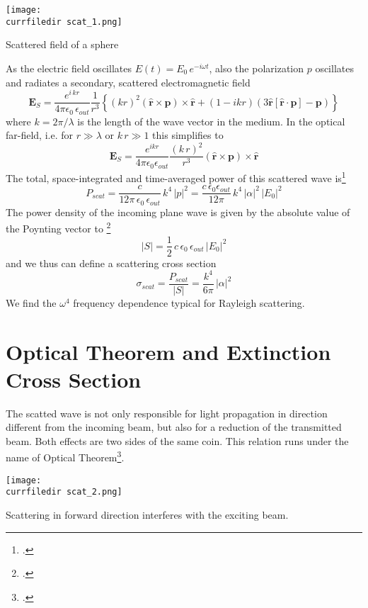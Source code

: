 \begin{marginfigure}
   \texttt{[image: \\currfiledir scat\_1.png]}
  \caption{Scattered field of  a sphere}
\end{marginfigure}


As the electric field oscillates $E(t) = E_0 \, e^{-i \omega t}$, also the polarization $p$ oscillates and radiates a secondary, scattered electromagnetic field 
\[
  \mathbf{E}_S = \frac{ e^{i \, k  r} }{4\pi\epsilon_0 \, \epsilon_{out}}  \frac{1}{r^3}\left\{
      (k r )^2 \left( \hat{\mathbf{r}} \times \mathbf{p} \right) \times \hat{\mathbf{r}} +
      \left( 1 -  i k r \right)
        \left( 3\hat{\mathbf{r}} \left[\hat{\mathbf{r}} \cdot \mathbf{p}\right] - \mathbf{p} \right)
    \right\}
\]
where $k = 2 \pi / \lambda$ is the length of the wave vector in the medium. In the optical far-field, i.e. for $r \gg \lambda$ or $k \, r \gg 1$ this simplifies to 
\[
  \mathbf{E}_S = \frac{e^{ikr}}{4\pi\epsilon_0 \epsilon_{out} } 
      \frac{( k \, r)^2}{ r^3} \left( \hat{\mathbf{r}} \times \mathbf{p} \right) \times \hat{\mathbf{r}} 
\]
The total, space-integrated and time-averaged power of this scattered wave is\footcite[chapter 4.5.2]{Nolting-ED}
\[
P_{scat} =\frac{c  }{12 \pi  \, \epsilon_0 \, \epsilon_{out} } \, k^4 \, |p|^2 =
\frac{c \, \epsilon_0 \epsilon_{out} }{12 \pi  } \, k^4 \, |\alpha|^2 \, |E_0|^2
\]
The power density of the incoming plane wave is given by the absolute value of the Poynting vector to \footcite[chapter 4.3.8]{Nolting-ED}
\[
 |S| = \frac{1}{2} \, c \, \epsilon_0 \, \epsilon_{out} \, |E_0|^2
\]
and we thus can define a scattering cross section
\[
\sigma_{scat} = \frac{P_{scat}}{|S|} = \frac{k^4}{6 \pi }  \, |\alpha|^2 
\]
We find the $\omega^4$ frequency dependence typical for Rayleigh scattering.



\section{Optical Theorem and Extinction Cross Section}

The scatted wave is not only responsible for light propagation in direction different from the incoming beam, but also for a reduction of the transmitted beam. Both effects are two sides of the same coin. This relation runs under the name of Optical Theorem\footcite{Newton:1976cz}.

\begin{marginfigure}
   \texttt{[image: \\currfiledir scat\_2.png]}
  \caption{Scattering in forward direction interferes with the exciting beam.}
\end{marginfigure}

